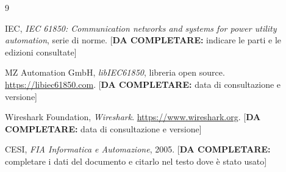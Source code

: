 \documentclass[11pt,a4paper,italian,oneside,openany]{book}
\newcommand{\daf}[1]{{\color{red}[\textbf{DA COMPLETARE:} #1]}}
\begin{document}
\begin{thebibliography}{9}

IEC, \textit{IEC 61850: Communication networks and systems for power utility automation}, serie di norme. \daf{indicare le parti e le edizioni consultate}

MZ Automation GmbH, \textit{libIEC61850}, libreria open source. \url{https://libiec61850.com}. \daf{data di consultazione e versione}

Wireshark Foundation, \textit{Wireshark}. \url{https://www.wireshark.org}. \daf{data di consultazione e versione}

CESI, \textit{FIA Informatica e Automazione}, 2005. \daf{completare i dati del documento e citarlo nel testo dove è stato usato}

\end{thebibliography}
\nocite{cesi}
\end{document}

